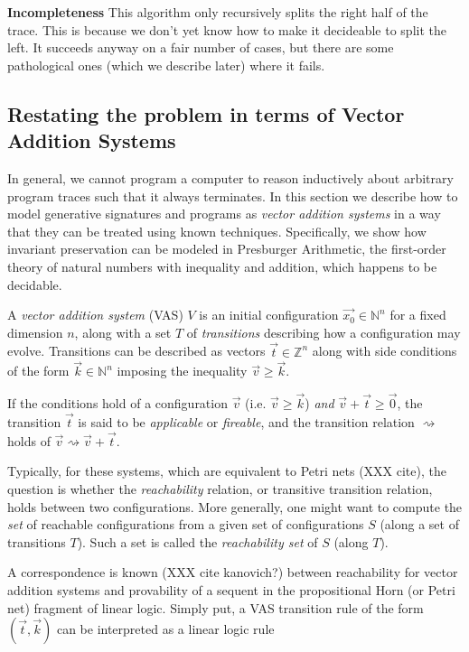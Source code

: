\documentclass[fullpage, 11pt]{article}
\newcommand{\stepsto}{\rightsquigarrow}
\begin{document}
{\bf Incompleteness}\smallskip
This algorithm only recursively splits the right half
of the trace. This is because we don't yet know how to make it decideable
to split the left. It succeeds anyway on a fair number of cases, but there
are some pathological ones (which we describe later) where it fails.


\subsection{Restating the problem in terms of Vector Addition Systems}

In general, we cannot program a computer to reason inductively about
arbitrary program traces such that it always terminates. In this section we
describe how to model generative signatures and programs as {\em vector
addition systems} in a way that they can be treated using known
techniques. Specifically, we show how invariant preservation can be modeled
in Presburger Arithmetic, the first-order theory of natural numbers with
inequality and addition, which happens to be decidable.


A {\em vector addition system} (VAS) $V$ is an initial
configuration $\vec{x_0} \in \mathbb{N}^n$ for a fixed dimension $n$,
along with a set $T$ of {\em transitions} describing how a configuration
may evolve. Transitions can be described as vectors $\vec{t} \in \mathbb{Z}^n$
along with side conditions of the form $\vec{k} \in \mathbb{N}^n$ imposing
the inequality $\vec{v} \geq \vec{k}$.

If the conditions hold of a configuration $\vec{v}$ (i.e. $\vec{v} \geq
\vec{k}$) {\em and} $\vec{v} + \vec{t} \geq \vec{0}$, the transition
$\vec{t}$ is said to be {\em applicable} or {\em fireable}, and the
transition relation $\stepsto$ holds of $\vec{v} \stepsto \vec{v}+\vec{t}$.

Typically, for these systems, which are equivalent to Petri nets (XXX
cite), the question is whether the {\em reachability} relation, or
transitive transition relation, holds between two configurations. More
generally, one might want to compute the {\em set} of reachable
configurations from a given set of configurations $S$ (along a set of
transitions $T$). Such a set is called the {\em reachability set} of
$S$ (along $T$). 

A correspondence is known (XXX cite kanovich?) between reachability for
vector addition systems and provability of a sequent in the propositional
Horn (or Petri net) fragment of linear logic. Simply put, a VAS transition
rule of the form $(\vec{t}, \vec{k})$
can be interpreted as a linear logic rule
\end{document}
